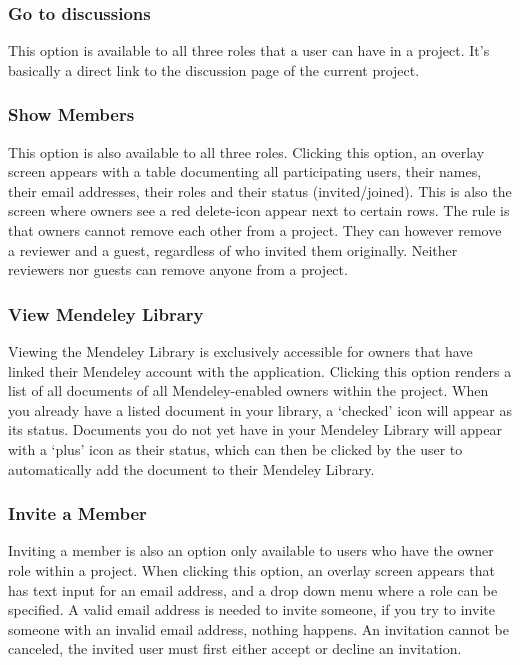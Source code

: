 \subsubsection{Go to discussions}

This option is available to all three roles that a user can have in a project. It's basically a direct link to the discussion page of the current
project.

\subsubsection{Show Members}

This option is also available to all three roles. Clicking this option, an overlay screen appears with a table documenting all participating
users, their names, their email addresses, their roles and their status (invited/joined). This is also the screen where owners see a red
delete-icon appear next to certain rows. The rule is that owners cannot remove each other from a project. They can however remove a reviewer 
and a guest, regardless of who invited them originally. Neither reviewers nor guests can remove anyone from a project.

\subsubsection{View Mendeley Library}

Viewing the Mendeley Library is exclusively accessible for owners that have linked their Mendeley account with the application. Clicking this
option renders a list of all documents of all Mendeley-enabled owners within the project. When you already have a listed document in your library, a 
`checked' icon will appear as its status. Documents you do not yet have in your Mendeley Library will appear with a `plus' icon as their status,
which can then be clicked by the user to automatically add the document to their Mendeley Library.

\subsubsection{Invite a Member}

Inviting a member is also an option only available to users who have the owner role within a project. When clicking this option, an overlay
screen appears that has text input for an email address, and a drop down menu where a role can be specified. A valid email address is needed
to invite someone, if you try to invite someone with an invalid email address, nothing happens. An invitation cannot be canceled, the 
invited user must first either accept or decline an invitation.

